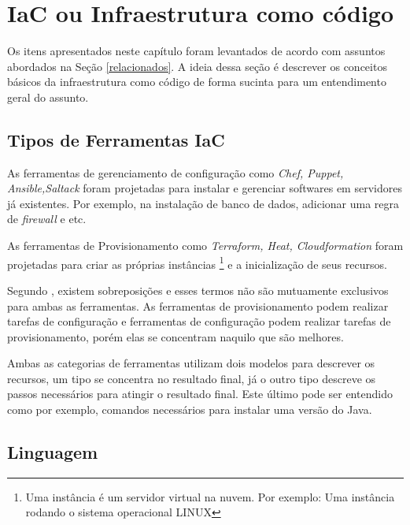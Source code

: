 \section{\esp IaC ou Infraestrutura como código} \label{IaC}

Os itens apresentados neste capítulo foram levantados de acordo com assuntos abordados na Seção \ref{relacionados}. A ideia dessa seção é descrever os conceitos básicos da infraestrutura como código de forma sucinta para um entendimento geral do assunto.


\subsection{Tipos de Ferramentas IaC} \label{tools_iac}
As ferramentas de gerenciamento de configuração como \textit{Chef, Puppet, Ansible,Saltack} foram projetadas para instalar e gerenciar softwares em servidores já existentes. Por exemplo, na instalação de banco de dados, adicionar uma regra de \textit{firewall} e etc.

As ferramentas de Provisionamento como \textit{Terraform, Heat, Cloudformation} foram projetadas para criar as próprias instâncias \footnote{Uma instância é um servidor virtual na nuvem. Por exemplo: Uma instância rodando o sistema operacional LINUX} e a inicialização de seus recursos. 

Segundo , existem sobreposições e esses termos não são mutuamente exclusivos para ambas as ferramentas. As ferramentas de provisionamento podem realizar tarefas de configuração e ferramentas de configuração podem realizar tarefas de provisionamento, porém elas se concentram naquilo que são melhores. 

Ambas as categorias de ferramentas utilizam dois modelos para descrever os recursos, um tipo se concentra no resultado final, já o outro tipo descreve os passos necessários para atingir o resultado final. Este último pode ser entendido como por exemplo, comandos necessários para instalar uma versão do Java.

\subsection{Linguagem}

